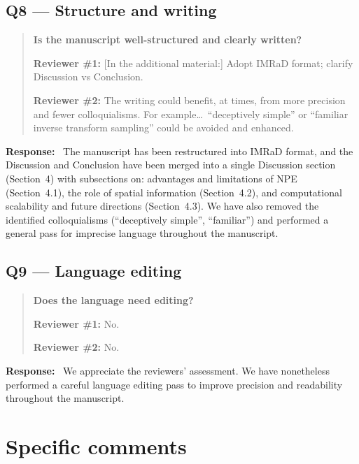 \documentclass[11pt,a4paper]{article}
\newenvironment{reviewercomment}{%
  \begin{quote}\itshape\color{reviewerblue}%
}{%
  \end{quote}%
}
\newcommand{\response}{\textbf{Response:}~}
\begin{document}
\subsection*{Q8 --- Structure and writing}

\begin{reviewercomment}
\textbf{Is the manuscript well-structured and clearly written?}

\textbf{Reviewer \#1:} [In the additional material:] Adopt IMRaD format; clarify Discussion vs Conclusion.

\textbf{Reviewer \#2:} The writing could benefit, at times, from more precision and fewer colloquialisms. For example\ldots\ ``deceptively simple'' or ``familiar inverse transform sampling'' could be avoided and enhanced.
\end{reviewercomment}

\response
The manuscript has been restructured into IMRaD format, and the Discussion and Conclusion have been merged into a single Discussion section (Section~4) with subsections on: advantages and limitations of NPE (Section~4.1), the role of spatial information (Section~4.2), and computational scalability and future directions (Section~4.3). We have also removed the identified colloquialisms (``deceptively simple'', ``familiar'') and performed a general pass for imprecise language throughout the manuscript.


\subsection*{Q9 --- Language editing}

\begin{reviewercomment}
\textbf{Does the language need editing?}

\textbf{Reviewer \#1:} No.

\textbf{Reviewer \#2:} No.
\end{reviewercomment}

\response
We appreciate the reviewers' assessment. We have nonetheless performed a careful language editing pass to improve precision and readability throughout the manuscript.


\section*{Specific comments}
\end{document}
